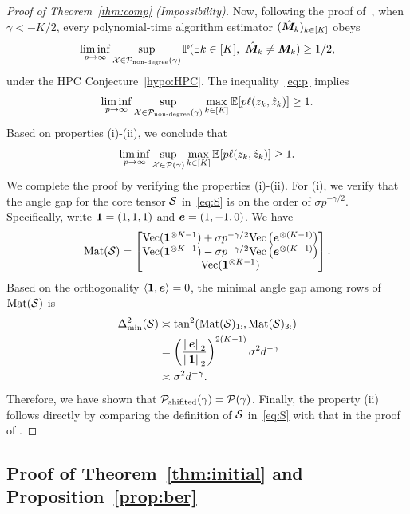 \documentclass[journal]{IEEEtran}
\theoremstyle{definition}
\theoremstyle{definition}
\newcommand{\Mat}{\text{Mat}}
\begin{document}
\begin{proof}[Proof of Theorem~\ref{thm:comp} (Impossibility)]
Now, following the proof of~\cite[Theorem 7]{han2020exact}, when $\gamma<-K/2$, every polynomial-time algorithm estimator $(\hat {\bm M}_k)_{k\in[K]}$ obeys
\begin{align}\label{eq:p}
\liminf_{p\to \infty} \sup_{\tX\in \tP_{\text{non-degree}}(\gamma)}\mathbb{P}(\exists k \in[K],\  \hat \mM_k \neq \mM_k)\geq 1/2,
\end{align}
under the HPC Conjecture~\ref{hypo:HPC}.
The inequality~\eqref{eq:p} implies
\[
\liminf_{p\to \infty} \sup_{\mathcal{X}\in \mathcal{P}_{\text{non-degree}}(\gamma)}\max_{k\in[K]}\mathbb{E}[p\ell(z_k, \hat z_k)]\geq 1.
\]
Based on properties (i)-(ii), we conclude that
\[
\liminf_{p\to \infty} \sup_{\mathcal{X}\in \mathcal{P}(\gamma)}\max_{k\in[K]}\mathbb{E}[p\ell(z_k, \hat z_k)]\geq 1.
\]
We complete the proof by verifying the properties (i)-(ii). For (i), we verify that the angle gap for the core tensor $\mathcal{S}$ in~\eqref{eq:S} is on the order of $\sigma p^{-\gamma/2}$. Specifically, write $\mathbf{1}=(1,1,1)$ and $\bm{e}=(1,-1,0)$. We have
\[
\Mat(\tS)=
\begin{bmatrix}
\text{Vec}(\mone^{\otimes K-1})+\sigma p^{-\gamma/2}\text{Vec}\left(\me^{\otimes (K-1)}\right) \\
\text{Vec}(\mone^{\otimes K-1})-\sigma p^{-\gamma/2}\text{Vec}\left(\me^{\otimes (K-1)}\right) \\
\text{Vec}(\mone^{\otimes K-1})
\end{bmatrix}.
\]
Based on the orthogonality $\langle \mathbf{1}, \bm{e}\rangle=0$, the minimal angle gap among rows of $\Mat(\tS)$ is
\begin{align}
\Delta^2_{\min}(\tS)&\asymp \tan^2(\Mat(\tS)_{1:}, \Mat(\tS)_{3:})
\\
&=\left(\onorm{\me}_2 \over \onorm{\mone}_2\right)^{2(K-1)} \sigma^2 d^{-\gamma}\\
&\asymp \sigma^2 d^{-\gamma}.
\end{align}
Therefore, we have shown that $\mathcal{P}_{\text{shifited}}(\gamma)=\mathcal{P}(\gamma)$. Finally, the property (ii) follows directly by comparing the definition of $\mathcal{S}$ in~\eqref{eq:S} with that in the proof of \cite[Theorem 7]{han2020exact}. 
\end{proof}

\subsection{Proof of Theorem~\ref{thm:initial} and Proposition~\ref{prop:ber}} \label{sec:initial_prove}
\end{document}
